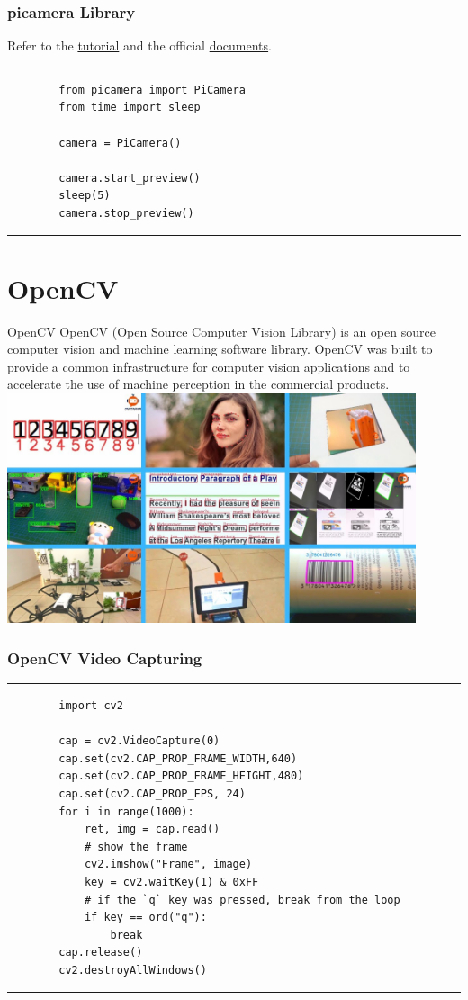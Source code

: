 \documentclass[12pt,letterpaper]{beamer}
\begin{document}
\begin{frame}[fragile]
    \frametitle{picamera Library}
    Refer to the \href{https://projects.raspberrypi.org/en/projects/getting-started-with-picamera}{tutorial} and the official \href{https://picamera.readthedocs.io/en/release-1.13/}{documents}.
    \rule{\textwidth}{1pt}   
    \scriptsize
    \begin{verbatim}
        from picamera import PiCamera
        from time import sleep

        camera = PiCamera()

        camera.start_preview()
        sleep(5)
        camera.stop_preview()
    \end{verbatim}
    \rule{\textwidth}{1pt}   
\end{frame}

\section{OpenCV}

\begin{frame}{OpenCV}
    \href{https://opencv.org/}{OpenCV} (Open Source Computer Vision Library) is an open source computer vision and machine learning software library. 
    OpenCV was built to provide a common infrastructure for computer vision applications and to accelerate the use of machine perception in the commercial products.
    \includegraphics[width=0.9\textwidth]{opencv_projects}
\end{frame}

\begin{frame}[fragile]
    \frametitle{OpenCV Video Capturing}
    \rule{\textwidth}{1pt}   
    {\scriptsize
    \begin{verbatim} 
        import cv2

        cap = cv2.VideoCapture(0)
        cap.set(cv2.CAP_PROP_FRAME_WIDTH,640)
        cap.set(cv2.CAP_PROP_FRAME_HEIGHT,480)
        cap.set(cv2.CAP_PROP_FPS, 24)
        for i in range(1000):
            ret, img = cap.read()
            # show the frame
            cv2.imshow("Frame", image)
            key = cv2.waitKey(1) & 0xFF
            # if the `q` key was pressed, break from the loop
            if key == ord("q"):
                break
        cap.release()
        cv2.destroyAllWindows()
    \end{verbatim} 
}
    \rule{\textwidth}{1pt}   
\end{frame}
\end{document}
